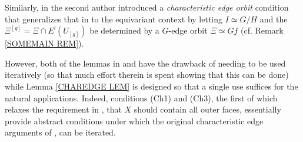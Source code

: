 \documentclass[a4paper,10pt,draft]{article}%
\begin{document}
\begin{remark}
\begin{itemize}
Similarly, in \cite[Lemma 7.39]{Per17} the second author introduced a \textit{characteristic edge orbit} condition that generalizes that in \cite{MW09} to the equivariant context 
by letting $I \simeq G/H$
and the $\Xi^{[g]}=\Xi \cap E^{\mathsf{i}}(U_{[g]})$ be determined by a $G$-edge orbit $\Xi \simeq Gf$ (cf. Remark \ref{SOMEMAIN REM}).

However, both of the lemmas in \cite{MW09} and \cite{Per17}
have the drawback of needing to be used iteratively
(so that much effort therein is spent showing that this can be done) while Lemma \ref{CHAREDGE LEM} is designed so that a single use suffices for the natural applications.
Indeed, conditions (Ch1) and (Ch3), the first of which relaxes the requirement in \cite{MW09},\cite{Per17} that $X$ should contain all outer faces, essentially provide abstract conditions under which the original characteristic edge arguments of \cite{MW09},\cite{Per17} can be iterated.
%
\end{itemize}
\end{remark}
\end{document}
